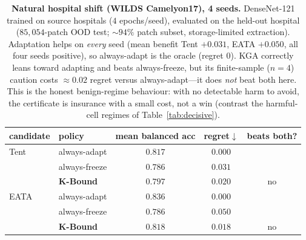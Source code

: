 \documentclass[conference]{IEEEtran}
\theoremstyle{plain}
\theoremstyle{definition}
\begin{document}
\begin{table}[t]\centering\small
\begin{tabular}{llccc}
\toprule
candidate & policy & mean balanced acc & regret$\downarrow$ & beats both? \\
\midrule
Tent & always-adapt    & $0.817$ & $\mathbf{0.000}$ & \\
     & always-freeze   & $0.786$ & $0.031$ & \\
     & \textbf{K-Bound} & $0.797$ & $0.020$ & no \\
\midrule
EATA & always-adapt    & $0.836$ & $\mathbf{0.000}$ & \\
     & always-freeze   & $0.786$ & $0.050$ & \\
     & \textbf{K-Bound} & $0.818$ & $0.018$ & no \\
\bottomrule
\end{tabular}
\caption{\textbf{Natural hospital shift (WILDS Camelyon17), 4 seeds.} DenseNet-121 trained on
source hospitals ($4$ epochs/seed), evaluated on the held-out hospital ($85{,}054$-patch OOD
test; $\sim\!94\%$ patch subset, storage-limited extraction). Adaptation helps on \emph{every}
seed (mean benefit Tent $+0.031$, EATA $+0.050$, all four seeds positive), so always-adapt is
the oracle (regret $0$). \textsc{KGA} correctly leans toward adapting and beats always-freeze,
but its finite-sample ($n{=}4$) caution costs $\approx\!0.02$ regret versus always-adapt---it
does \emph{not} beat both here. This is the honest benign-regime behaviour: with no detectable
harm to avoid, the certificate is insurance with a small cost, not a win (contrast the
harmful-cell regimes of Table~\ref{tab:decisive}).}
\label{tab:camelyon}
\end{table}
\end{document}
